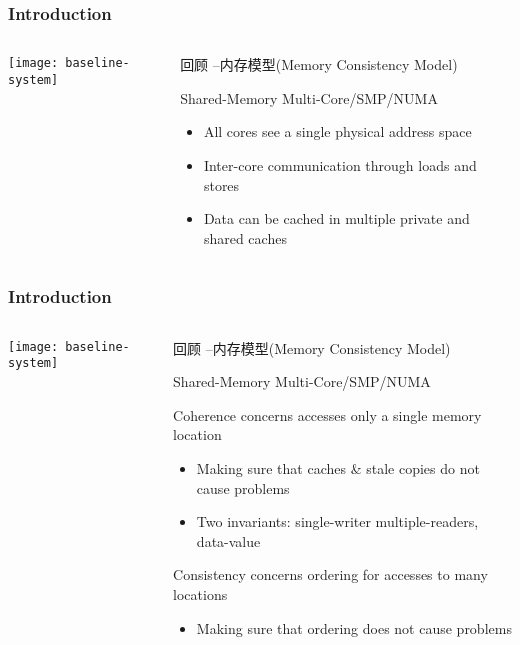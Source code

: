 \begin{frame}[plain]	
	\frametitle{Introduction}
	
	
	\begin{columns}
		
		\begin{column}{.4\textwidth}
			\texttt{[image: baseline-system]}
		\end{column}
		\begin{column}{.6\textwidth}
			回顾 --内存模型(Memory Consistency Model)
			
			Shared-Memory Multi-Core/SMP/NUMA
			
			\begin{itemize}
				\item All cores see a single physical address space
				\item Inter-core communication through loads and stores
				\item Data can be cached in multiple private and shared caches
			\end{itemize}		
			
		\end{column}
	\end{columns}
	
\end{frame}


\begin{frame}[plain]	
	\frametitle{Introduction}
	
	
	\begin{columns}
		
		\begin{column}{.4\textwidth}
			\texttt{[image: baseline-system]}
		\end{column}
		\begin{column}{.6\textwidth}
			回顾 --内存模型(Memory Consistency Model)
			
			Shared-Memory Multi-Core/SMP/NUMA
			
			Coherence concerns accesses only a single memory location
			\begin{itemize}
				\item Making sure that caches \& stale copies do not cause problems
				\item Two invariants: single-writer multiple-readers, data-value
			\end{itemize}
			\pause
			Consistency concerns ordering for accesses to many locations
			\begin{itemize}
				\item Making sure that ordering does not cause problems
			\end{itemize}			
			
		\end{column}
	\end{columns}
	
\end{frame}

